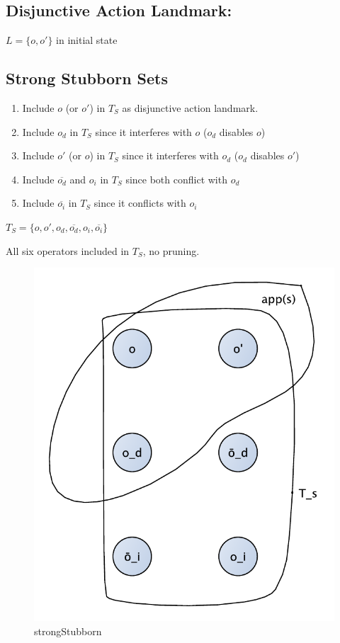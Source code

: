 \documentclass[11pt,a4paper]{article}
\begin{document}
\subsection*{Disjunctive Action Landmark:}
$ L=\{o, o'\} $ in initial state

\subsection*{Strong Stubborn Sets}
\begin{enumerate}
\item Include $o$ (or $o'$) in $T_S$ as disjunctive action landmark.
\item Include $o_d$ in $T_S$ since it interferes with $o$ ($o_d$ disables $o$)
\item Include $o'$ (or $o$) in $T_S$ since it interferes with $o_d$ ($o_d$ disables $o'$)
\item Include $\overline{o_d}$ and $o_i$ in $T_S$ since both conflict with $o_d$
\item Include $\overline{o_i}$ in $T_S$ since it conflicts with $o_i$
\end{enumerate}
$T_S = \{o, o', o_d, \overline{o_d}, o_i, \overline{o_i}\} $

All six operators included in $T_S$, no pruning.

\begin{figure}[h!]
\centering
\includegraphics[scale=0.4]{strongStubborn}
\caption{strongStubborn}
\end{figure}
\end{document}
